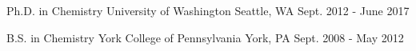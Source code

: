 


\begin{cventries}


\cventry
{Ph.D. in Chemistry
} %
{University of Washington} %
{Seattle, WA} %
{Sept. 2012 - June 2017} %
{}



\cventry
{B.S. in Chemistry} %
{York College of Pennsylvania} %
{York, PA} %
{Sept. 2008 - May 2012} %
{}


\end{cventries}
